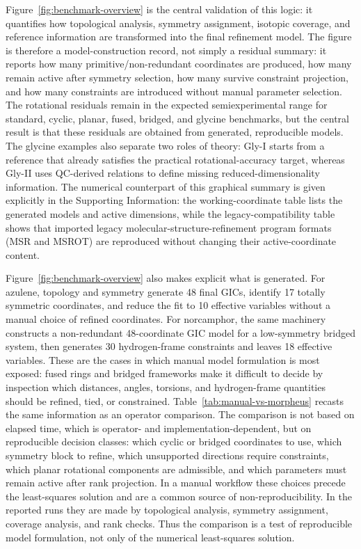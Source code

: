 \documentclass[aip,jcp,reprint,longbibliography,floatfix]{revtex4-2}
\begin{document}
Figure~\ref{fig:benchmark-overview} is the central validation of this logic:
it quantifies how topological analysis, symmetry assignment,
isotopic coverage, and reference information are transformed
into the final refinement model. The figure is therefore a
model-construction record, not simply a residual summary: it reports how many
primitive/non-redundant coordinates are produced, how many
remain active after symmetry selection, how many survive constraint
projection, and how many constraints are introduced without manual parameter
selection. The rotational residuals remain in the expected semiexperimental
range for standard, cyclic, planar, fused, bridged, and glycine benchmarks,
but the central result is that these residuals are obtained from generated,
reproducible models. The glycine examples also separate two roles of theory:
Gly-I starts from a reference that already satisfies the practical
rotational-accuracy target, whereas Gly-II uses QC-derived relations to define
missing reduced-dimensionality information. The numerical counterpart of this
graphical summary is given explicitly in the Supporting Information: the
working-coordinate table lists the generated models and active dimensions,
while the legacy-compatibility table shows that imported legacy
molecular-structure-refinement program formats (MSR and MSROT) are reproduced
without changing their active-coordinate content.

Figure~\ref{fig:benchmark-overview} also makes explicit what is generated.
For azulene, topology and symmetry generate 48 final GICs, identify 17
totally symmetric coordinates, and reduce the fit to 10 effective variables
without a manual choice of refined coordinates. For norcamphor, the same
machinery constructs a non-redundant 48-coordinate GIC model for a
low-symmetry bridged system, then generates 30 hydrogen-frame constraints and
leaves 18 effective variables. These are the cases in which manual model
formulation is most exposed: fused rings and bridged frameworks make it
difficult to decide by inspection which distances, angles, torsions, and
hydrogen-frame quantities should be refined, tied, or constrained.
Table~\ref{tab:manual-vs-morpheus} recasts the same information as an
operator comparison. The comparison is not based on elapsed time, which is
operator- and implementation-dependent, but on reproducible decision classes:
which cyclic or bridged coordinates to use, which symmetry block to refine,
which unsupported directions require constraints, which planar rotational
components are admissible, and which parameters must remain active after rank
projection. In a manual workflow these choices precede the least-squares
solution and are a common source of non-reproducibility. In the reported runs
they are made by topological analysis, symmetry assignment, coverage analysis,
and rank checks. Thus the comparison is a test of reproducible model
formulation, not only of the numerical least-squares solution.
\end{document}
